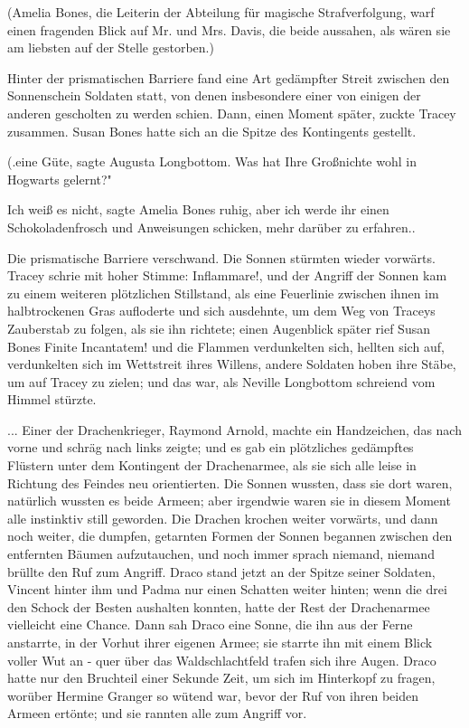 (Amelia Bones, die Leiterin der Abteilung für magische Strafverfolgung, warf
einen fragenden Blick auf Mr. und Mrs. Davis, die beide aussahen, als wären sie
am liebsten auf der Stelle gestorben.)

Hinter der prismatischen Barriere fand eine Art gedämpfter Streit zwischen den
Sonnenschein Soldaten statt, von denen insbesondere einer von einigen der
anderen gescholten zu werden schien. Dann, einen Moment später, zuckte Tracey
zusammen. Susan Bones hatte sich an die Spitze des Kontingents gestellt.

(\grqq{}.eine Güte\grqq{}, sagte Augusta Longbottom. \glqq{}Was hat Ihre
Großnichte wohl in Hogwarts gelernt?"

\glqq{}Ich weiß es nicht\grqq{}, sagte Amelia Bones ruhig, \glqq{}aber ich werde
ihr einen Schokoladenfrosch und Anweisungen schicken, mehr darüber zu
erfahren.\grqq{}.

Die prismatische Barriere verschwand. Die Sonnen stürmten wieder vorwärts.
Tracey schrie mit hoher Stimme: \glqq{}Inflammare!\grqq{}, und der Angriff der
Sonnen kam zu einem weiteren plötzlichen Stillstand, als eine Feuerlinie
zwischen ihnen im halbtrockenen Gras aufloderte und sich ausdehnte, um dem Weg
von Traceys Zauberstab zu folgen, als sie ihn richtete; einen Augenblick später
rief Susan Bones \glqq{}Finite Incantatem!\grqq{} und die Flammen verdunkelten
sich, hellten sich auf, verdunkelten sich im Wettstreit ihres Willens, andere
Soldaten hoben ihre Stäbe, um auf Tracey zu zielen; und das war, als Neville
Longbottom schreiend vom Himmel stürzte.

... Einer der Drachenkrieger, Raymond Arnold, machte ein Handzeichen, das nach
vorne und schräg nach links zeigte; und es gab ein plötzliches gedämpftes
Flüstern unter dem Kontingent der Drachenarmee, als sie sich alle leise in
Richtung des Feindes neu orientierten. Die Sonnen wussten, dass sie dort waren,
natürlich wussten es beide Armeen; aber irgendwie waren sie in diesem Moment
alle instinktiv still geworden. Die Drachen krochen weiter vorwärts, und dann
noch weiter, die dumpfen, getarnten Formen der Sonnen begannen zwischen den
entfernten Bäumen aufzutauchen, und noch immer sprach niemand, niemand brüllte
den Ruf zum Angriff. Draco stand jetzt an der Spitze seiner Soldaten, Vincent
hinter ihm und Padma nur einen Schatten weiter hinten; wenn die drei den Schock
der Besten aushalten konnten, hatte der Rest der Drachenarmee vielleicht eine
Chance. Dann sah Draco eine Sonne, die ihn aus der Ferne anstarrte, in der
Vorhut ihrer eigenen Armee; sie starrte ihn mit einem Blick voller Wut an - quer
über das Waldschlachtfeld trafen sich ihre Augen. Draco hatte nur den Bruchteil
einer Sekunde Zeit, um sich im Hinterkopf zu fragen, worüber Hermine Granger so
wütend war, bevor der Ruf von ihren beiden Armeen ertönte; und sie rannten alle
zum Angriff vor.

